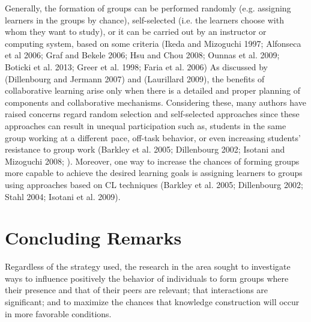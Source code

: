 Generally, the formation of groups can be performed randomly (e.g. assigning learners in the groups by chance), self-selected (i.e. the learners choose with whom they want to study), or it can be carried out by an instructor or computing system, based on some criteria (Ikeda and Mizoguchi 1997; Alfonseca et al 2006; Graf and Bekele 2006; Hsu and Chou 2008; Ounnas et al. 2009; Boticki et al. 2013; Greer et al. 1998; Faria et al. 2006)
As discussed by (Dillenbourg and Jermann 2007) and (Laurillard 2009), the benefits of collaborative learning arise only when there is a detailed and proper planning of components and collaborative mechanisms. 
Considering these, many authors have raised concerns regard random selection and self-selected approaches since these approaches can result in unequal participation such as, students in the same group working at a different pace, off-task behavior, or even increasing students’ resistance to group work (Barkley et al. 2005; Dillenbourg 2002; Isotani and Mizoguchi 2008; ).
Moreover, one way to increase the chances of forming groups more capable to achieve the desired learning goals is assigning learners to groups using approaches based on CL techniques (Barkley et al. 2005; Dillenbourg 2002; Stahl 2004; Isotani et al. 2009).

\section{Concluding Remarks}

Regardless of the strategy used, the research in the area sought to investigate ways to influence positively the behavior of individuals to form groups where their presence and that of their peers are relevant; that interactions are significant; and to maximize the chances that knowledge construction will occur in more favorable conditions. 